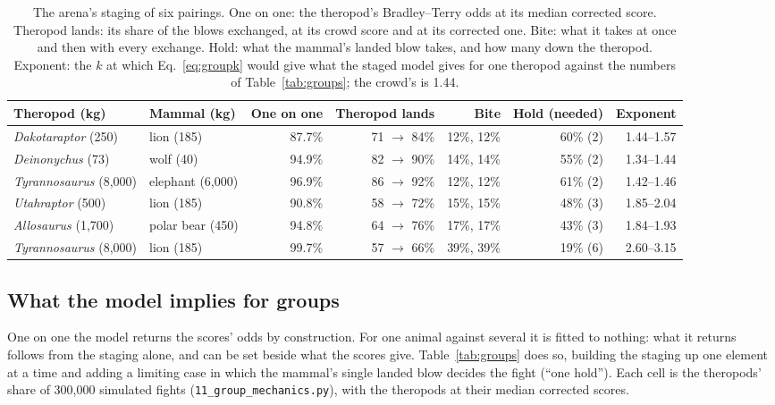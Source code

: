 \documentclass[11pt]{article}
\begin{document}
\begin{table}[H]
\centering
\footnotesize
\setlength{\tabcolsep}{4pt}
\begin{tabular}{llrrrrr}
\toprule
Theropod (kg) & Mammal (kg) & One on one & Theropod lands & Bite & Hold (needed) & Exponent \\
\midrule
\textit{Dakotaraptor} (250) & lion (185) & 87.7\% & 71 $\to$ 84\% & 12\%, 12\% & 60\% (2) & 1.44--1.57 \\
\textit{Deinonychus} (73) & wolf (40) & 94.9\% & 82 $\to$ 90\% & 14\%, 14\% & 55\% (2) & 1.34--1.44 \\
\textit{Tyrannosaurus} (8,000) & elephant (6,000) & 96.9\% & 86 $\to$ 92\% & 12\%, 12\% & 61\% (2) & 1.42--1.46 \\
\textit{Utahraptor} (500) & lion (185) & 90.8\% & 58 $\to$ 72\% & 15\%, 15\% & 48\% (3) & 1.85--2.04 \\
\textit{Allosaurus} (1,700) & polar bear (450) & 94.8\% & 64 $\to$ 76\% & 17\%, 17\% & 43\% (3) & 1.84--1.93 \\
\textit{Tyrannosaurus} (8,000) & lion (185) & 99.7\% & 57 $\to$ 66\% & 39\%, 39\% & 19\% (6) & 2.60--3.15 \\
\bottomrule
\end{tabular}
\caption{The arena's staging of six pairings. One on one: the theropod's Bradley--Terry odds at its median corrected score. Theropod lands: its share of the blows exchanged, at its crowd score and at its corrected one. Bite: what it takes at once and then with every exchange. Hold: what the mammal's landed blow takes, and how many down the theropod. Exponent: the $k$ at which Eq.~\eqref{eq:groupk} would give what the staged model gives for one theropod against the numbers of Table~\ref{tab:groups}; the crowd's is 1.44.}
\label{tab:staging}
\end{table}

\subsection{What the model implies for groups}
One on one the model returns the scores' odds by construction. For one animal against several it is fitted to nothing: what it returns follows from the staging alone, and can be set beside what the scores give. Table~\ref{tab:groups} does so, building the staging up one element at a time and adding a limiting case in which the mammal's single landed blow decides the fight (``one hold''). Each cell is the theropods' share of 300,000 simulated fights (\texttt{11\_group\_mechanics.py}), with the theropods at their median corrected scores.
\end{document}
